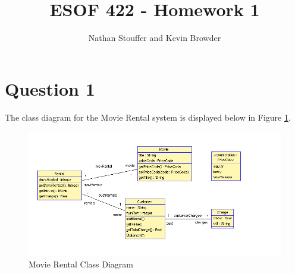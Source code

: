 \documentclass{article}
\begin{document}
	
\title{ESOF 422 - Homework 1}
\author{Nathan Stouffer and Kevin Browder}

\maketitle
\newpage

\section*{Question 1}

	The class diagram for the Movie Rental system is displayed below in Figure \ref{fig:q1class}.
	\begin{figure}[h]
		\includegraphics[width=\linewidth]{Q1Class.PNG}
		\caption{Movie Rental Class Diagram}
		\label{fig:q1class}
	\end{figure}
	
\end{document}
